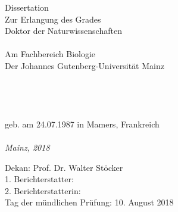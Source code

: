 %
\begin{titlepage}
	\centering
	\hfill
	\vfill
	{\LARGE\textbf{\thesisTitle} \par}
  ~\\
  ~\\
  ~\\
  ~\\
  ~\\
  Dissertation \\
  Zur Erlangung des Grades \\
  Doktor der Naturwissenschaften\\
  ~\\
  Am Fachbereich Biologie \\
  Der Johannes Gutenberg-Universität Mainz\\
	~\\
	~\\
	~\\
	{\Large\textbf{\thesisName}} \\
	geb. am 24.07.1987 in Mamers, Frankreich
	~\\
	~\\
	\vfill
	\textit{\large Mainz, 2018} \\
\end{titlepage}



\hfill
\vfill
{
	\small
	Dekan: Prof. Dr. Walter Stöcker \\
	1. Berichterstatter: \thesisFirstReviewer \\
	2. Berichterstatterin: \thesisSecondReviewer \\
	Tag der mündlichen Prüfung: 10. August 2018 \\
}


